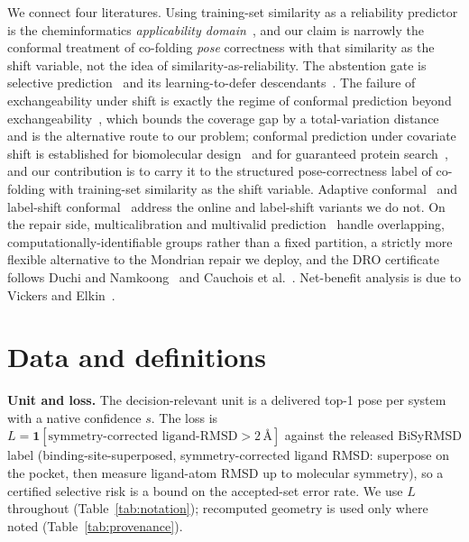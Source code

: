 \documentclass[10pt]{article}
\begin{document}
We connect four literatures. Using training-set similarity as a reliability predictor is the
cheminformatics \emph{applicability domain}~\citep{sheridan2004,sahigara2012,norinder2014}, and our claim is
narrowly the conformal treatment of co-folding \emph{pose} correctness with that similarity as the shift
variable, not the idea of similarity-as-reliability. The abstention gate is selective
prediction~\citep{chow1970,geifman2017} and its learning-to-defer descendants~\citep{madras2018,mozannar2020}.
The failure of exchangeability under shift is exactly the regime of conformal prediction beyond
exchangeability~\citep{barber2023beyond}, which bounds the coverage gap by a total-variation distance and is
the alternative route to our problem; conformal prediction under covariate shift is established for
biomolecular design~\citep{fannjiang2022} and for guaranteed protein search~\citep{boger2025}, and our
contribution is to carry it to the structured pose-correctness label of co-folding with training-set
similarity as the shift variable. Adaptive conformal~\citep{gibbs2021aci} and label-shift
conformal~\citep{podkopaev2021labelshift} address the online and label-shift variants we do not. On the
repair side, multicalibration and multivalid prediction~\citep{hebertjohnson2018,gupta2022multivalid} handle
overlapping, computationally-identifiable groups rather than a fixed partition, a strictly more flexible
alternative to the Mondrian repair we deploy, and the DRO certificate follows Duchi and
Namkoong~\citep{duchinamkoong2021} and Cauchois et al.~\citep{cauchois2024}. Net-benefit analysis is due to
Vickers and Elkin~\citep{vickers2006}.

\section{Data and definitions}\label{sec:data}
\textbf{Unit and loss.} The decision-relevant unit is a delivered top-1 pose per system with a native
confidence $s$. The loss is $L=\mathbf{1}[\text{symmetry-corrected ligand-RMSD}>2\,\text{\AA}]$ against the
released BiSyRMSD label (binding-site-superposed, symmetry-corrected ligand RMSD: superpose on the pocket,
then measure ligand-atom RMSD up to molecular symmetry), so a certified selective risk is a bound on the
accepted-set error rate. We use $L$ throughout (Table~\ref{tab:notation}); recomputed geometry is used only
where noted (Table~\ref{tab:provenance}).
\end{document}
